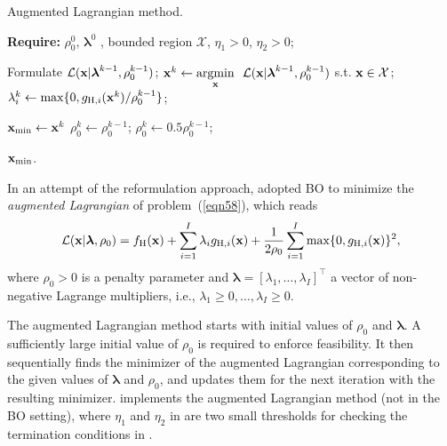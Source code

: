 \documentclass[journal ]{new-aiaa}
\begin{document}
	\begin{algorithm}
		\caption{Augmented Lagrangian method.}\label{Algo6}
		\begin{algorithmic}[1]
			\State \textbf{Require:} $\rho^0_0$, $\boldsymbol{\lambda}^0$ , bounded region $\mathcal{X}$, $\eta_1>0$, $\eta_2>0$; \label{Algo6:1}
			
			\State Formulate $\mathcal{L}({\bf x}|\boldsymbol{\lambda}^{k-1},\rho^{k-1}_0)$; \label{Algo6:3}
			\State ${\bf x}^{k} \gets \underset{{\bf x}}{\mathrm{argmin}} \ \ \mathcal{L}({\bf x}|\boldsymbol{\lambda}^{k-1},\rho^{k-1}_0)$ s.t. ${\bf x} \in \mathcal{X}$; \label{Algo6:4}
			\State ${\lambda}^k_i \gets \max \{0,g_{\text{H},i}({\bf x}^k)/\rho^{k-1}_0\}$;
			
			 \label{Algo6:6}
			\State ${\bf x}_{\min} \gets {\bf x}^{k}$
			\Else
			\State $\rho^k_0 \gets \rho^{k-1}_0$;
			\Else
			\State $\rho^k_0 \gets 0.5\rho^{k-1}_0$;
			\EndIf  	
			\EndIf 
			\EndFor
			
			\State \Return ${\bf x}_{\min}$.
		\end{algorithmic}
	\end{algorithm}
	
	In an attempt of the reformulation approach, \citet{Gramacy2016} adopted BO to minimize the \textit{augmented Lagrangian} of problem~(\ref{eqn58}), which reads
	\begin{equation}\label{eqn63}
		\mathcal{L}({\bf x}|\boldsymbol{\lambda},\rho_0)  = f_\text{H}({\bf x}) + \sum_{i=1}^{I} \lambda_i g_{\text{H},i}({\bf x}) 
		+ \frac{1}{2 \rho_0} \sum_{i=1}^{I} \max\{0,g_{\text{H},i}({\bf x})\}^2, 
	\end{equation}
	where  $\rho_0>0$ is a penalty parameter and $\boldsymbol{\lambda}=[\lambda_1,\dots,\lambda_I]^\intercal$ a vector of non-negative Lagrange multipliers, i.e., $\lambda_1 \geq 0,\dots,\lambda_I \geq 0$.
	
	The augmented Lagrangian method starts with initial values of $\rho_0$ and $\boldsymbol{\lambda}$.
	A sufficiently large initial value of $\rho_0$ is required to enforce feasibility.
	It then sequentially finds the minimizer of the augmented Lagrangian corresponding to the given values of $\boldsymbol{\lambda}$ and $\rho_0$, and updates them for the next iteration with the resulting minimizer.
	 implements the augmented Lagrangian method (not in the BO setting), where
	$\eta_1$ and $\eta_2$ in  are two small thresholds for checking the termination conditions in .    
	
\end{document}
